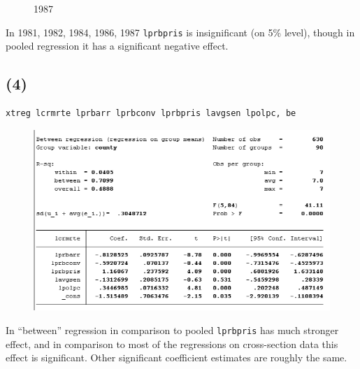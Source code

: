\documentclass[12pt,a4paper, oneside]{extreport}
\begin{document}
\begin{figure}[htb]
\begin{minipage}[H]{0.5\linewidth}
	\caption{1987}
\end{minipage}
\end{figure}


\newpage

In 1981, 1982, 1984, 1986, 1987 \texttt{lprbpris} is insignificant (on 5\% level), though in pooled regression it has a significant negative effect.  

\subsection*{(4)}

\begin{verbatim}
xtreg lcrmrte lprbarr lprbconv lprbpris lavgsen lpolpc, be
\end{verbatim}

\begin{figure}[H]
	\centering
	\includegraphics[width=0.7\linewidth]{screenshot020}
	\label{fig:screenshot001}
\end{figure}


In “between” regression in comparison to pooled  \texttt{lprbpris} has much stronger effect, and in comparison to most of the regressions  on cross-section  data this effect is significant. Other significant coefficient estimates are roughly the same.
\end{document}
